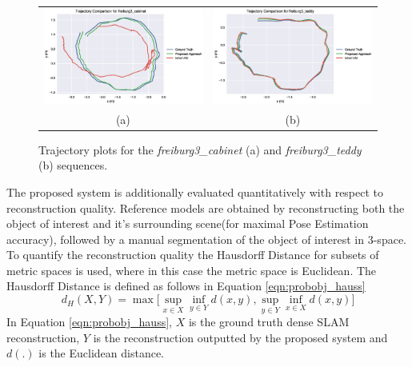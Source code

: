 \begin{figure}[ht]
  \label{fig:probobj_traj}
  \centering
  \begin{tabular}{cc}
  \includegraphics[width=.5\linewidth]{figures/object_recon/plots/traj/cab_traj.eps} & 
  \includegraphics[width=.5\linewidth]{figures/object_recon/plots/traj/ted_traj.eps} \\
  (a) & (b)
  \end{tabular}
  \caption[Probabilistic Object Reconstruction Trajectory Plots]
  {Trajectory plots for the \textit{freiburg3\_cabinet} (a) 
  and \textit{\textsf{freiburg3\_teddy}} (b) sequences.}
\end{figure}

The proposed system is additionally evaluated quantitatively with respect to reconstruction 
quality. Reference models are obtained by reconstructing both the object of interest and it's 
surrounding scene(for maximal Pose Estimation accuracy), followed by a manual segmentation of 
the object of interest in 3-space. To quantify the reconstruction quality the Hausdorff 
Distance \cite{Hausdorff} for subsets of metric spaces is used, where in this case the metric 
space is Euclidean. The Hausdorff Distance is defined as follows in Equation \ref{eqn:probobj_hauss}
\begin{equation}
  \label{eqn:probobj_hauss}
  d_{H}(X, Y) = \max \Bigg[
  \sup_{x \in X} \inf_{y \in Y} d(x, y), \sup_{y \in Y} \inf_{x \in X} d(x, y) 
  \Bigg]
\end{equation}
In Equation \ref{eqn:probobj_hauss}, $X$ is the ground truth dense SLAM reconstruction, 
$Y$ is the reconstruction outputted by the proposed system and $d(.)$ is the Euclidean 
distance.

